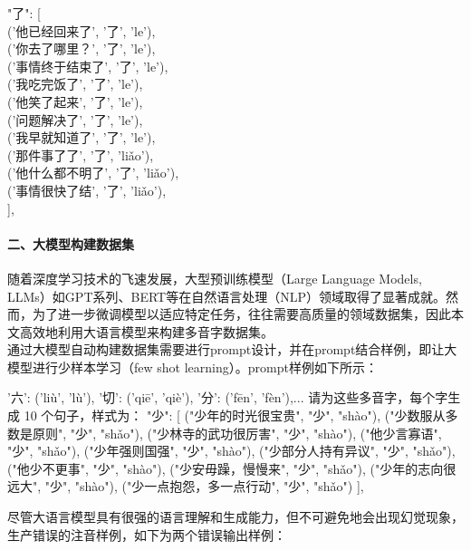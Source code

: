 \documentclass[12pt,hyperref,a4paper,UTF8]{ctexart}
\begin{document}
\begin{enumerate}
  
  \begin{tcolorbox}
    "了": [\\
      ('他已经回来了', '了', 'le'),\\
      ('你去了哪里？', '了', 'le'),\\
      ('事情终于结束了', '了', 'le'),\\
      ('我吃完饭了', '了', 'le'),\\
      ('他笑了起来', '了', 'le'),\\
      ('问题解决了', '了', 'le'),\\
      ('我早就知道了', '了', 'le'),\\
      ('那件事了了', '了', 'liǎo'),\\
      ('他什么都不明了', '了', 'liǎo'),\\
      ('事情很快了结', '了', 'liǎo'),\\
      ],
  \end{tcolorbox}
  \end{enumerate}
  \paragraph{二、大模型构建数据集}
  \indent 随着深度学习技术的飞速发展，大型预训练模型（Large Language Models, LLMs）如GPT系列、BERT等在自然语言处理（NLP）领域取得了显著成就。然而，为了进一步微调模型以适应特定任务，往往需要高质量的领域数据集，因此本文高效地利用大语言模型来构建多音字数据集。\\
  \indent 通过大模型自动构建数据集需要进行prompt设计，并在prompt结合样例，即让大模型进行少样本学习（few shot learning）。prompt样例如下所示：
  \begin{tcolorbox}
    '六': ('liù', 'lù'), '切': ('qiē', 'qiè'), '分': ('fēn', 'fèn'),... 请为这些多音字，每个字生成 10 个句子，样式为： "少": [ ("少年的时光很宝贵", "少", "shào"), ("少数服从多数是原则", "少", "shǎo"), ("少林寺的武功很厉害", "少", "shào"), ("他少言寡语", "少", "shǎo"), ("少年强则国强", "少", "shào"), ("少部分人持有异议", "少", "shǎo"), ("他少不更事", "少", "shào"), ("少安毋躁，慢慢来", "少", "shǎo"), ("少年的志向很远大", "少", "shào"), ("少一点抱怨，多一点行动", "少", "shǎo") ], 
  \end{tcolorbox}
  \indent 尽管大语言模型具有很强的语言理解和生成能力，但不可避免地会出现幻觉现象，生产错误的注音样例，如下为两个错误输出样例：
\end{document}
